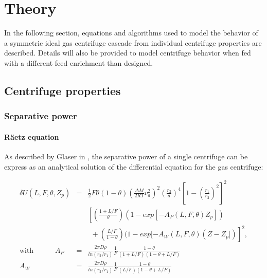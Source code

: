\section{Theory}

In the following section, equations and algorithms used to model the behavior of
a symmetric ideal gas centrifuge cascade from individual centrifuge properties
are described. Details will also be provided to model centrifuge behavior
when fed with a different feed enrichment than designed.

\subsection{Centrifuge properties}

\subsubsection{Separative power}

\paragraph{R\"aetz equation}

As described by Glaser in \cite{glaser.2008}, the separative power of a single centrifuge can be express as an analytical solution \cite{raetz.phd} of the
differential equation for the gas centrifuge:

\begin{eqnarray}
    \label{eq:raetz}
    \delta U(L,F,\theta,Z_{p}) &= &\frac{1}{2}
            F\theta(1 - \theta)
            \left(\frac{\Delta M}{2 RT}v_{a}^{2}\right)^{2}
            \left(\frac{r_{2}}{a}\right)^{4}
            \left[1 - \left(\frac{r_{1}}{r_{2}}\right)^{2}\right]^{2}
            \label{eq_raetz}\\
        &&
            \left[
                \left(\frac{1+L/F}{\theta}\right)
                (1- exp[ - A_{P}(L,F,\theta)Z_{p}])  \nonumber  \right. \\
        &&~~ + \left.\left(\frac{L/F}{1 - \theta}\right)
                (1 - exp[ -A_{W}(L,F,\theta)(Z - Z_{p}])\right]^{2}, \nonumber
                \\
    \textrm{with~ ~ ~ ~ ~}
        A_{P} &= &\frac{2\pi D\rho }{ ln(r_{2}/r_{1}) }
                 \frac{ 1 }{ F }
                 \frac{ 1-\theta }{(1+L/F)(1-\theta+L/F) }\\
        A_{W} &= &\frac{2\pi D\rho }{ ln(r_{2}/r_{1}) }
                 \frac{ 1 }{ F }
                 \frac{ 1-\theta }{ (L/F)(1-\theta+L/F) }
\end{eqnarray}


